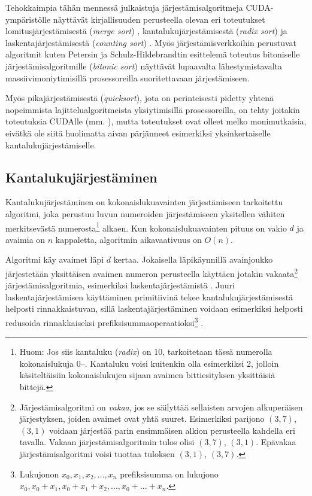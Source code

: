 \documentclass[a4paper,11pt]{article}
\newcommand{\engl}[1]{\foreignlanguage{english}{\em #1}}
\begin{document}
Tehokkaimpia tähän mennessä julkaistuja järjestämisalgoritmeja CUDA-ym\-pä\-ris\-töl\-le näyttävät kirjallisuuden perusteella olevan eri toteutukset lomitusjärjestämisestä (\engl{merge sort}) \cite{satish2009} \cite{satish2010}, kantalukujärjestämisestä (\engl{radix sort}) \cite{satish2009} \cite{merrill2010} \cite{satish2010} ja laskentajärjestämisestä (\engl{counting sort}) \cite{kolonias2011}. Myös järjestämisverkkoihin perustuvat algoritmit kuten Petersin ja Schulz-Hildebrandtin \cite{peters2012gems} esittelemä toteutus bitoniselle järjestämisalgoritmille (\engl{bitonic sort}) näyttävät lupaavalta lähestymistavalta massiivimoniytimisillä prosessoreilla suoritettavaan järjestämiseen.

Myös pikajärjestämisestä (\engl{quicksort}), jota on perinteisesti pidetty yhtenä nopeimmista lajittelualgoritmeista yksiytimisillä prosessoreilla, on tehty joitakin toteutuksia CUDAlle (mm. \cite{cederman2009}), mutta toteutukset ovat olleet melko monimutkaisia, eivätkä ole siitä huolimatta aivan pärjänneet esimerkiksi yksinkertaiselle kantalukujärjestämiselle.

\subsection{Kantalukujärjestäminen}

Kantalukujärjestäminen on kokonaislukuavainten järjestämiseen tarkoitettu algoritmi, joka perustuu luvun numeroiden järjestämiseen yksitellen vähiten merkitsevästä numerosta\footnote{Huom: Jos siis kantaluku (\engl{radix}) on 10, tarkoitetaan tässä numerolla kokonaislukuja 0\thinspace--. Kantaluku voisi kuitenkin olla esimerkiksi 2, jolloin käsiteltäisiin kokonaislukujen sijaan avaimen bittiesityksen yksittäisiä bittejä.} alkaen. Kun kokonaislukuavainten pituus on vakio $d$ ja avaimia on $n$ kappaletta, algoritmin aikavaativuus on $O(n)$.

Algoritmi käy avaimet läpi $d$ kertaa. Jokaisella läpikäynnillä avainjoukko järjestetään yksittäisen avaimen numeron perusteella käyttäen jotakin vakaata\footnote{Järjestämisalgoritmi on \emph{vakaa}, jos se säilyttää sellaisten arvojen alkuperäisen järjestyksen, joiden avaimet ovat yhtä suuret. Esimerkiksi parijono $(3, 7)$, $(3, 1)$ voidaan järjestää parin ensimmäisen alkion perusteella kahdella eri tavalla. Vakaan järjestämisalgoritmin tulos olisi $(3, 7)$, $(3, 1)$. Epävakaa järjestämisalgoritmi voisi tuottaa tuloksen $(3, 1)$, $(3, 7)$.} järjestämisalgoritmia, esimerkiksi laskentajärjestämistä \cite{clrs}. Juuri laskentajärjestämisen käyttäminen primitiivinä tekee kantalukujärjestämisestä helposti rinnakkaistuvan, sillä laskentajärjestäminen voidaan esimerkiksi helposti redusoida rinnakkaiseksi prefiksisummaoperaatioksi\footnote{Lukujonon $x_0, x_1, x_2, ..., x_n$ prefiksisumma on lukujono $x_0, x_0 + x_1, x_0 + x_1 + x_2, ..., x_0 + ... + x_n$.} \cite{satish2009}.
\end{document}
